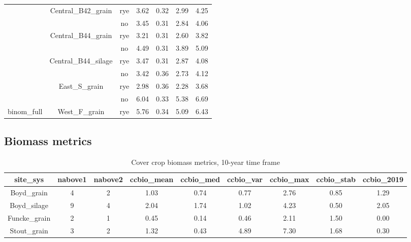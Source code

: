 \documentclass[
]{article}
\begin{document}
\begin{table}[H]
\begin{tabular}[t]{ccccccc}
 & \multirow{-2}{*}{\centering\arraybackslash Central\_B42\_grain} & rye & 3.62 & 0.32 & 2.99 & 4.25\\

\rowcolor{gray!6}   &  & no & 3.45 & 0.31 & 2.84 & 4.06\\

 & \multirow{-2}{*}{\centering\arraybackslash Central\_B44\_grain} & rye & 3.21 & 0.31 & 2.60 & 3.82\\

\rowcolor{gray!6}   &  & no & 4.49 & 0.31 & 3.89 & 5.09\\

 & \multirow{-2}{*}{\centering\arraybackslash Central\_B44\_silage} & rye & 3.47 & 0.31 & 2.87 & 4.08\\

\rowcolor{gray!6}   &  & no & 3.42 & 0.36 & 2.73 & 4.12\\

 & \multirow{-2}{*}{\centering\arraybackslash East\_S\_grain} & rye & 2.98 & 0.36 & 2.28 & 3.68\\

\rowcolor{gray!6}   &  & no & 6.04 & 0.33 & 5.38 & 6.69\\

\multirow{-10}{*}{\centering\arraybackslash binom\_full} & \multirow{-2}{*}{\centering\arraybackslash West\_F\_grain} & rye & 5.76 & 0.34 & 5.09 & 6.43\\
\bottomrule
\end{tabular}
\end{table}

\hypertarget{biomass-metrics}{%
\subsection{Biomass metrics}\label{biomass-metrics}}

\begin{table}[H]

\caption{\label{tab:ccbio10yr}Cover crop biomass metrics, 10-year time frame}
\centering
\begin{tabular}[t]{ccccccccc}
\toprule
site\_sys & nabove1 & nabove2 & ccbio\_mean & ccbio\_med & ccbio\_var & ccbio\_max & ccbio\_stab & ccbio\_2019\\
\midrule
\rowcolor{gray!6}  Boyd\_grain & 4 & 2 & 1.03 & 0.74 & 0.77 & 2.76 & 0.85 & 1.29\\
\cmidrule{1-9}
Boyd\_silage & 9 & 4 & 2.04 & 1.74 & 1.02 & 4.23 & 0.50 & 2.05\\
\cmidrule{1-9}
\rowcolor{gray!6}  Funcke\_grain & 2 & 1 & 0.45 & 0.14 & 0.46 & 2.11 & 1.50 & 0.00\\
\cmidrule{1-9}
Stout\_grain & 3 & 2 & 1.32 & 0.43 & 4.89 & 7.30 & 1.68 & 0.30\\
\bottomrule
\end{tabular}
\end{table}
\end{document}
